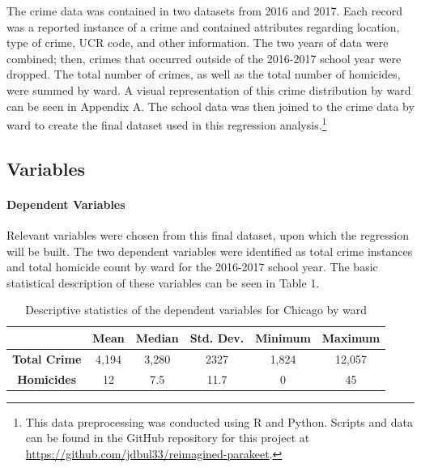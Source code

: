 \documentclass[12pt]{article}
\begin{document}
The crime data was contained in two datasets from 2016 and 2017.  Each record was a reported instance of a crime and contained attributes regarding location, type of crime, UCR code, and other information.  The two years of data were combined; then, crimes that occurred outside of the 2016-2017 school year were dropped.  The total number of crimes, as well as the total number of homicides, were summed by ward.  A visual representation of this crime distribution by ward can be seen in Appendix A.  The school data was then joined to the crime data by ward to create the final dataset used in this regression analysis.\footnote{This data preprocessing was conducted using R and Python.  Scripts and data can be found in the GitHub repository for this project at \href{https://github.com/jdbul33/reimagined-parakeet}{https://github.com/jdbul33/reimagined-parakeet}.}


\subsection{Variables}

\paragraph{Dependent Variables}
Relevant variables were chosen from this final dataset, upon which the regression will be built.  The two dependent variables were identified as total crime instances and total homicide count by ward for the 2016-2017 school year.  The basic statistical description of these variables can be seen in Table 1.

\begin{center}
	\begin{table}[h]
	\begin{tabular}{ c | c | c | c | c | c }
		
		 & \textbf{Mean} & \textbf{Median} & \textbf{Std. Dev.} & \textbf{Minimum} & \textbf{Maximum} \\ 
		 \hline
		 \textbf{Total Crime} & 4,194 & 3,280 & 2327 & 1,824 & 12,057 \\
		 \textbf{Homicides} & 12 & 7.5 & 11.7 & 0 & 45 \\
    
	\end{tabular}
\caption{Descriptive statistics of the dependent variables for Chicago by ward}
\end{table}
\end{center}  
\end{document}
